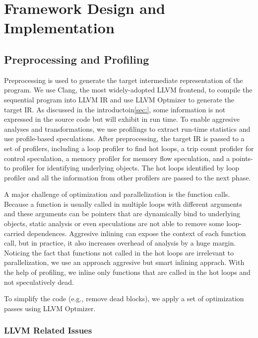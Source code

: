 \section{Framework Design and Implementation}

\subsection{Preprocessing and Profiling}

Preprocessing is used to generate the target intermediate representation
of the program. We use Clang, the most widely-adopted LLVM frontend, to compile
the sequential program into LLVM IR and use LLVM Optmizer to generate the target
IR. As discussed in the introductoin\ref{sec:}, some information is not
expressed in the source code but will exhibit in run time. To enable aggresive
analyses and transformations, we use profilings to extract run-time statistics
and use profile-based speculations. After preprocessing, the target IR is passed
to a set of profilers, including a loop profiler to find hot loops, a trip count
profider for control speculation, a memory profiler for memory flow speculation,
and a points-to profiler for identifying underlying objects. The hot loops
identified by loop profiler and all the information from other profilers are
passed to the next phase.



A major challenge of optimization and parallelization is the function calls.
Because a function is usually called in multiple loops with different arguments
and these arguments can be pointers that are dynamically bind to underlying
objects, static analysis or even speculations are not able to remove some
loop-carried dependences. Aggresive inlining can expose the context of each
function call, but in practice, it also increases overhead of analysis by a huge
margin. Noticing the fact that functions not called in the hot loops are
irrelevant to parallelization, we use an approach aggresive but smart inlining
apprach. With the help of profiling, we inline only functions that are called in
the hot loops and not speculatively dead.

To simplify the code (e.g., remove dead blocks), we apply a set of optimization
passes using LLVM Optmizer.


\subsubsection{LLVM Related Issues}

